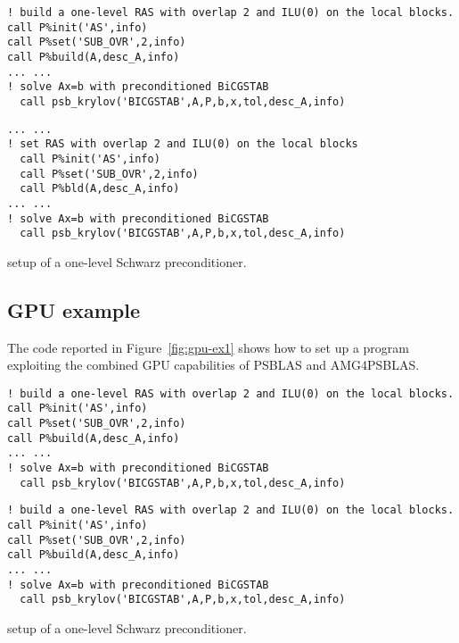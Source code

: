 \begin{listing}[h!]
\ifpdf
\begin{verbatim}
! build a one-level RAS with overlap 2 and ILU(0) on the local blocks.
call P%init('AS',info)
call P%set('SUB_OVR',2,info)
call P%build(A,desc_A,info)
... ...
! solve Ax=b with preconditioned BiCGSTAB
  call psb_krylov('BICGSTAB',A,P,b,x,tol,desc_A,info)
\end{verbatim}
\else
\begin{center}
\begin{minipage}{.90\textwidth}
{\small
\begin{verbatim}
... ...
! set RAS with overlap 2 and ILU(0) on the local blocks
  call P%init('AS',info)
  call P%set('SUB_OVR',2,info)
  call P%bld(A,desc_A,info)
... ...
! solve Ax=b with preconditioned BiCGSTAB
  call psb_krylov('BICGSTAB',A,P,b,x,tol,desc_A,info)
\end{verbatim}
}
\end{minipage}
\end{center}
\fi\vspace{-2em}%
\caption{setup of a one-level Schwarz preconditioner.\label{fig:ex4}}
\end{listing}



\subsection{GPU example\label{sec:gpu-example}}

The code reported in Figure~\ref{fig:gpu-ex1} shows how to set  up a
program exploiting the combined GPU capabilities of PSBLAS and
AMG4PSBLAS.
\begin{listing}[h!]
\ifpdf
\begin{verbatim}
! build a one-level RAS with overlap 2 and ILU(0) on the local blocks.
call P%init('AS',info)
call P%set('SUB_OVR',2,info)
call P%build(A,desc_A,info)
... ...
! solve Ax=b with preconditioned BiCGSTAB
  call psb_krylov('BICGSTAB',A,P,b,x,tol,desc_A,info)
\end{verbatim}
\else
\begin{center}
\begin{minipage}{.90\textwidth}
{\small
\begin{verbatim}
! build a one-level RAS with overlap 2 and ILU(0) on the local blocks.
call P%init('AS',info)
call P%set('SUB_OVR',2,info)
call P%build(A,desc_A,info)
... ...
! solve Ax=b with preconditioned BiCGSTAB
  call psb_krylov('BICGSTAB',A,P,b,x,tol,desc_A,info)
\end{verbatim}
}
\end{minipage}
\end{center}
\fi
\caption{setup of a one-level Schwarz preconditioner.\label{fig:gpu-ex1}}
\end{listing}



